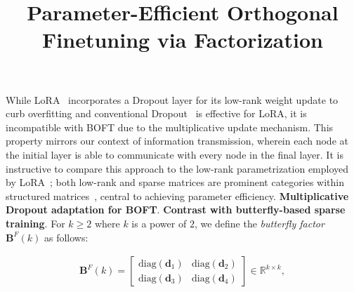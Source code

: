 \title{Parameter-Efficient Orthogonal Finetuning via Factorization}
While LoRA~\cite{hulora2022} incorporates a Dropout layer for its low-rank weight update to curb overfitting and conventional Dropout~\cite{srivastava2014dropout} is effective for LoRA, it is incompatible with BOFT due to the multiplicative update mechanism. This property mirrors our context of information transmission, wherein each node at the initial layer is able to communicate with every node in the final layer. It is instructive to compare this approach to the low-rank parametrization employed by LoRA~\cite{hulora2022}; both low-rank and sparse matrices are prominent categories within structured matrices~\cite{candes2011robust}, central to achieving parameter efficiency. \textbf{Multiplicative Dropout adaptation for BOFT}. \textbf{Contrast with butterfly-based sparse training}. For $k\geq 2$ where $k$ is a power of $2$, we define the \emph{butterfly factor} $\bm{B}^F(k)$ as follows:

\begin{equation}\label{eq:but_factor}
\begin{aligned}
    \bm{B}^F(k)=\begin{bmatrix}
    \text{diag}(\bm{d}_1) & \text{diag}(\bm{d}_2) \\
    \text{diag}(\bm{d}_3) & \text{diag}(\bm{d}_4)
    \end{bmatrix}\in\mathbb{R}^{k\times k},
\end{aligned}
\end{equation}

